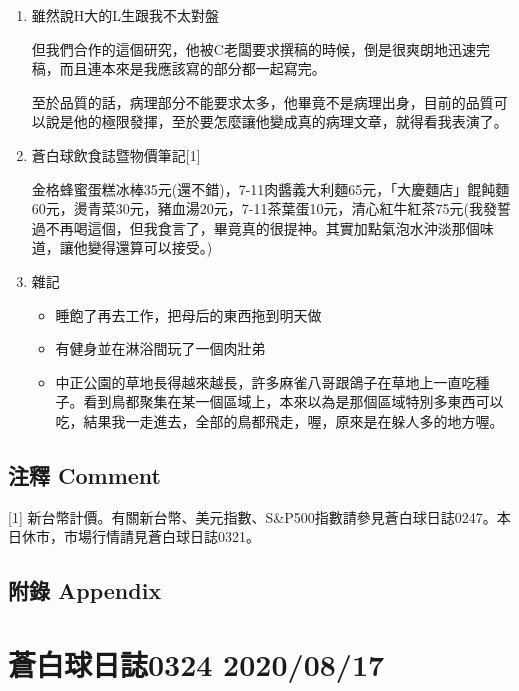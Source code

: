 \documentclass[a5paper, 11pt
]{book}
\providecommand{\tightlist}{%
  \setlength{\itemsep}{0pt}\setlength{\parskip}{0pt}}
\begin{document}
\begin{enumerate}
\def\labelenumi{\arabic{enumi}.}
\item
  雖然說H大的L生跟我不太對盤

  但我們合作的這個研究，他被C老闆要求撰稿的時候，倒是很爽朗地迅速完稿，而且連本來是我應該寫的部分都一起寫完。

  至於品質的話，病理部分不能要求太多，他畢竟不是病理出身，目前的品質可以說是他的極限發揮，至於要怎麼讓他變成真的病理文章，就得看我表演了。
\item
  蒼白球飲食誌暨物價筆記{[}1{]}

  金格蜂蜜蛋糕冰棒35元(還不錯)，7-11肉醬義大利麵65元，「大慶麵店」餛飩麵60元，燙青菜30元，豬血湯20元，7-11茶葉蛋10元，清心紅牛紅茶75元(我發誓過不再喝這個，但我食言了，畢竟真的很提神。其實加點氣泡水沖淡那個味道，讓他變得還算可以接受。)
\item
  雜記

  \begin{itemize}
  \tightlist
  \item
    睡飽了再去工作，把母后的東西拖到明天做
  \item
    有健身並在淋浴間玩了一個肉壯弟
  \item
    中正公園的草地長得越來越長，許多麻雀八哥跟鴿子在草地上一直吃種子。看到鳥都聚集在某一個區域上，本來以為是那個區域特別多東西可以吃，結果我一走進去，全部的鳥都飛走，喔，原來是在躲人多的地方喔。
  \end{itemize}
\end{enumerate}

\hypertarget{ux6ce8ux91cb-comment-76}{%
\subsection{注釋 Comment}\label{ux6ce8ux91cb-comment-76}}

{[}1{]}
新台幣計價。有關新台幣、美元指數、S\&P500指數請參見蒼白球日誌0247。本日休市，市場行情請見蒼白球日誌0321。

\hypertarget{ux9644ux9304-appendix-76}{%
\subsection{附錄 Appendix}\label{ux9644ux9304-appendix-76}}

\hypertarget{ux84bcux767dux7403ux65e5ux8a8c0324-20200817}{%
\section{蒼白球日誌0324
2020/08/17}\label{ux84bcux767dux7403ux65e5ux8a8c0324-20200817}}
\end{document}
